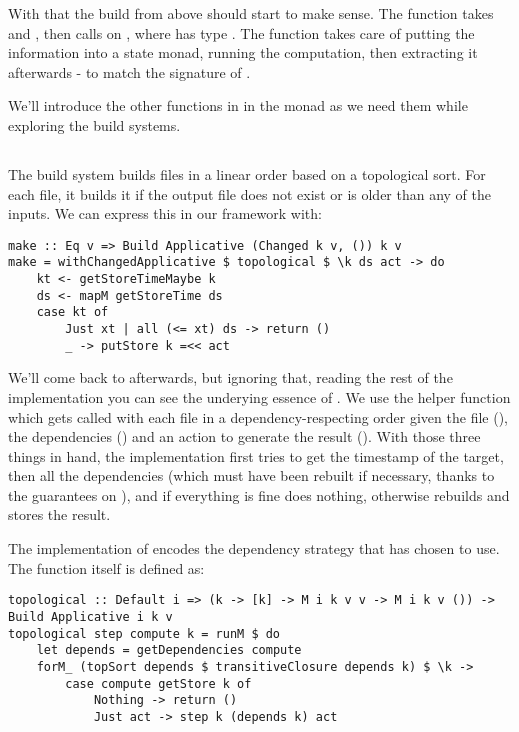 With that the  build from above should start to make sense. The function  takes  and , then calls  on , where  has type . The  function takes care of putting the information into a state monad, running the computation, then extracting it afterwards - to match the signature of .

We'll introduce the other functions in in the monad  as we need them while exploring the build systems.

\subsection{\Make}

The \Make build system builds files in a linear order based on a topological sort. For each file, it builds it if the output file does not exist or is older than any of the inputs. We can express this in our framework with:

\begin{verbatim}
make :: Eq v => Build Applicative (Changed k v, ()) k v
make = withChangedApplicative $ topological $ \k ds act -> do
    kt <- getStoreTimeMaybe k
    ds <- mapM getStoreTime ds
    case kt of
        Just xt | all (<= xt) ds -> return ()
        _ -> putStore k =<< act
\end{verbatim}

We'll come back to  afterwards, but ignoring that, reading the rest of the implementation you can see the underying essence of \Make. We use the helper function  which gets called with each file in a dependency-respecting order given the file (), the dependencies () and an action to generate the result (). With those three things in hand, the implementation first tries to get the timestamp of the target, then all the dependencies (which must have been rebuilt if necessary, thanks to the guarantees on ), and if everything is fine does nothing, otherwise rebuilds and stores the result.

The implementation of  encodes the dependency strategy that \Make has chosen to use. The function itself is defined as:

\begin{verbatim}
topological :: Default i => (k -> [k] -> M i k v v -> M i k v ()) -> Build Applicative i k v
topological step compute k = runM $ do
    let depends = getDependencies compute
    forM_ (topSort depends $ transitiveClosure depends k) $ \k ->
        case compute getStore k of
            Nothing -> return ()
            Just act -> step k (depends k) act
\end{verbatim}

